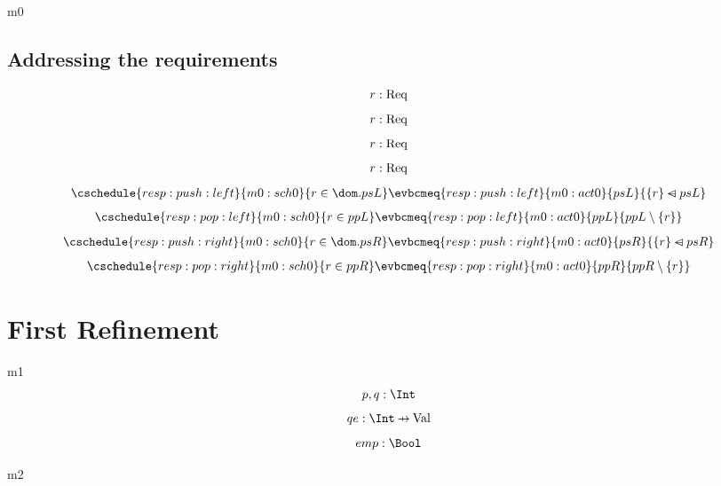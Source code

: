 \documentclass[12pt]{amsart}
\begin{document}
\begin{machine}{m0}
\subsection{Addressing the requirements}
\[ \indices{resp:pop:right}{r : \Req} \]
\[ \indices{resp:pop:left}{r : \Req} \]
\[ \indices{resp:push:right}{r : \Req} \]
\[ \indices{resp:push:left}{r : \Req} \]
\begin{align}
	\cschedule{resp:push:left}{m0:sch0}{ r \in \dom.psL }
	\evbcmeq{resp:push:left}{m0:act0}{psL}{ \{r\} \domsub psL }
\end{align}
\begin{align}
	\cschedule{resp:pop:left}{m0:sch0}{ r \in ppL }
	\evbcmeq{resp:pop:left}{m0:act0}{ppL}{ ppL \setminus \{ r \} }
\end{align}
\begin{align}
	\cschedule{resp:push:right}{m0:sch0}{ r \in \dom.psR }
	\evbcmeq{resp:push:right}{m0:act0}{psR}{ \{r\} \domsub psR }
\end{align}
\begin{align}
	\cschedule{resp:pop:right}{m0:sch0}{ r \in ppR }
	\evbcmeq{resp:pop:right}{m0:act0}{ppR}{ ppR \setminus \{ r \} }
\end{align}
\end{machine}
\section{First Refinement}
\begin{machine}{m1}
	\[ \variable{p,q : \Int} \]
	\[ \variable{qe : \Int \pfun \G} \]
	\[ \variable{emp : \Bool } \]
\end{machine}
\begin{machine}{m2}
\end{machine}
\end{document}
